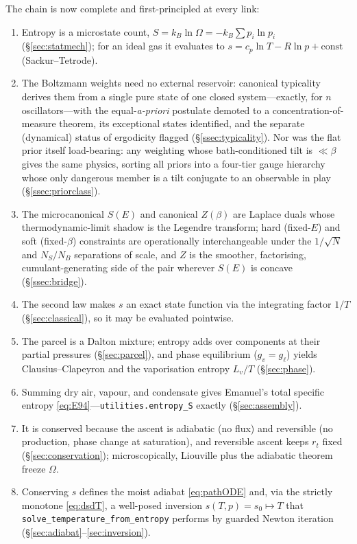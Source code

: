 \documentclass[11pt,a4paper]{article}
\theoremstyle{definition}
\newcommand{\Lv}{L_v}
\newcommand{\rt}{r_t}
\begin{document}
The chain is now complete and first-principled at every link:
\begin{enumerate}
\item Entropy is a microstate count, $S=k_B\ln\Omega=-k_B\sum p_i\ln p_i$
      (\S\ref{sec:statmech}); for an ideal gas it evaluates to
      $s=c_p\ln T-R\ln p+\mathrm{const}$ (Sackur--Tetrode).
\item The Boltzmann weights need no external reservoir: canonical typicality
      derives them from a single pure state of one closed system---exactly, for
      $n$ oscillators---with the equal-\emph{a-priori} postulate demoted to a
      concentration-of-measure theorem, its exceptional states identified, and
      the separate (dynamical) status of ergodicity flagged
      (\S\ref{ssec:typicality}). Nor was the flat prior itself load-bearing:
      any weighting whose bath-conditioned tilt is $\ll\beta$ gives the same
      physics, sorting all priors into a four-tier gauge hierarchy whose only
      dangerous member is a tilt conjugate to an observable in play
      (\S\ref{ssec:priorclass}).
\item The microcanonical $S(E)$ and canonical $Z(\beta)$ are Laplace duals
      whose thermodynamic-limit shadow is the Legendre transform; hard
      (fixed-$E$) and soft (fixed-$\beta$) constraints are operationally
      interchangeable under the $1/\sqrt N$ and $N_S/N_B$ separations of scale,
      and $Z$ is the smoother, factorising, cumulant-generating side of the
      pair wherever $S(E)$ is concave (\S\ref{ssec:bridge}).
\item The second law makes $s$ an exact state function via the integrating
      factor $1/T$ (\S\ref{sec:classical}), so it may be evaluated pointwise.
\item The parcel is a Dalton mixture; entropy adds over components at their
      partial pressures (\S\ref{sec:parcel}), and phase equilibrium
      ($g_v=g_\ell$) yields Clausius--Clapeyron and the vaporisation entropy
      $\Lv/T$ (\S\ref{sec:phase}).
\item Summing dry air, vapour, and condensate gives Emanuel's total specific
      entropy \eqref{eq:E94}---\texttt{utilities.entropy\_S} exactly
      (\S\ref{sec:assembly}).
\item It is conserved because the ascent is adiabatic (no flux) and reversible
      (no production, phase change at saturation), and reversible ascent keeps
      $\rt$ fixed (\S\ref{sec:conservation}); microscopically, Liouville plus
      the adiabatic theorem freeze $\Omega$.
\item Conserving $s$ defines the moist adiabat \eqref{eq:pathODE} and, via the
      strictly monotone \eqref{eq:dsdT}, a well-posed inversion
      $s(T,p)=s_0\mapsto T$ that \texttt{solve\_temperature\_from\_entropy}
      performs by guarded Newton iteration (\S\ref{sec:adiabat}--\ref{sec:inversion}).
\end{enumerate}
\end{document}
